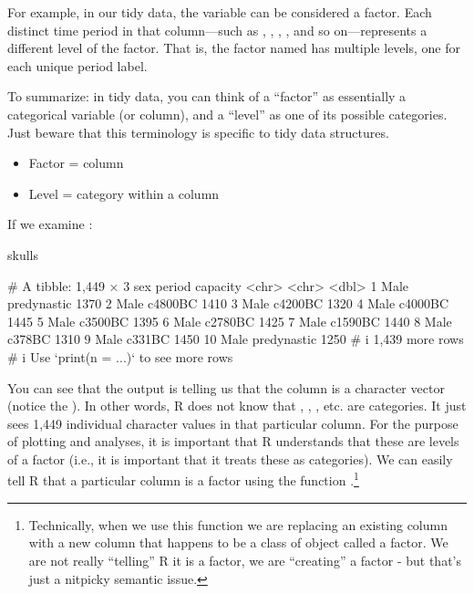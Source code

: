 For example, in our tidy data, the variable  can be considered a factor. Each distinct time period in that column—such as , , , , and so on—represents a different level of the factor. That is, the factor named  has multiple levels, one for each unique period label.

To summarize: in tidy data, you can think of a ``factor'' as essentially a categorical variable (or column), and a ``level'' as one of its possible categories. Just beware that this terminology is specific to tidy data structures.

\clearpage

{
\begin{itemize}
  \setlength\itemsep{-1em}
    \item Factor = column
    \item Level = category within a column
\end{itemize}
}

\noindent
If we examine :

\begin{inR}
skulls
\end{inR}
\begin{outR}
# A tibble: 1,449 × 3
   sex   period      capacity
   <chr> <chr>          <dbl>
 1 Male  predynastic     1370
 2 Male  c4800BC         1410
 3 Male  c4200BC         1320
 4 Male  c4000BC         1445
 5 Male  c3500BC         1395
 6 Male  c2780BC         1425
 7 Male  c1590BC         1440
 8 Male  c378BC          1310
 9 Male  c331BC          1450
10 Male  predynastic     1250
# i 1,439 more rows
# i Use `print(n = ...)` to see more rows
\end{outR}

\noindent
You can see that the output is telling us that the  column is a character vector (notice the ). In other words, R does not know that , , , etc. are categories. It just sees 1,449 individual character values in that particular column. For the purpose of plotting and analyses, it is important that R understands that these are levels of a factor (i.e., it is important that it treats these as categories). We can easily tell R that a particular column is a factor using the function .\footnote{Technically, when we use this function we are replacing an existing column with a new column that happens to be a class of object called a factor. We are not really ``telling'' R it is a factor, we are ``creating'' a factor - but that's just a nitpicky semantic issue.}

